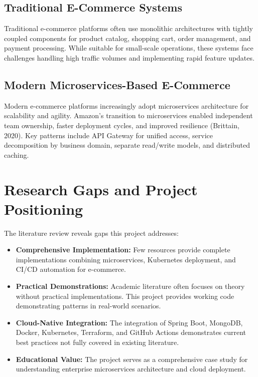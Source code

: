 \subsection{Traditional E-Commerce Systems}

Traditional e-commerce platforms often use monolithic architectures with tightly coupled components for product catalog, shopping cart, order management, and payment processing. While suitable for small-scale operations, these systems face challenges handling high traffic volumes and implementing rapid feature updates.

\subsection{Modern Microservices-Based E-Commerce}

Modern e-commerce platforms increasingly adopt microservices architecture for scalability and agility. Amazon's transition to microservices enabled independent team ownership, faster deployment cycles, and improved resilience (Brittain, 2020). Key patterns include API Gateway for unified access, service decomposition by business domain, separate read/write models, and distributed caching.

\section{Research Gaps and Project Positioning}

The literature review reveals gaps this project addresses:

\begin{itemize}
    \item \textbf{Comprehensive Implementation:} Few resources provide complete implementations combining microservices, Kubernetes deployment, and CI/CD automation for e-commerce.
    
    \item \textbf{Practical Demonstrations:} Academic literature often focuses on theory without practical implementations. This project provides working code demonstrating patterns in real-world scenarios.
    
    \item \textbf{Cloud-Native Integration:} The integration of Spring Boot, MongoDB, Docker, Kubernetes, Terraform, and GitHub Actions demonstrates current best practices not fully covered in existing literature.
    
    \item \textbf{Educational Value:} The project serves as a comprehensive case study for understanding enterprise microservices architecture and cloud deployment.
\end{itemize}

